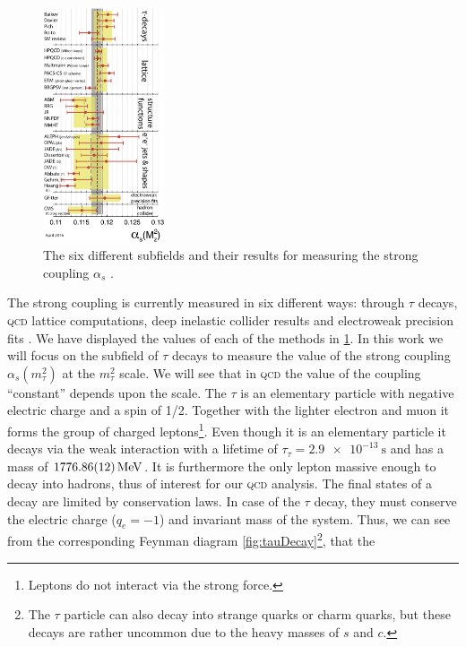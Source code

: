 \documentclass[../../index.tex]{subfiles}
\begin{document}
\begin{figure}
  \centering \vspace{-0.75cm}
  \includegraphics[width=0.32\textwidth]{./images/alphasDetermination.eps}
  \captionsetup{format=plain,font=footnotesize}
  \caption{The six different subfields and their results for measuring the
    strong coupling \(\alpha_s\) \cite{PDG2018}.}
  \label{fig:alphaSDetermination}
\end{figure}
The strong coupling is currently measured in six different ways: through
\(\tau\) decays, \textsc{qcd} lattice computations, deep inelastic collider
results and electroweak precision fits \cite{PDG2018}. We have displayed the
values of each of the methods in \cref{fig:alphaSDetermination}. In this work we
will focus on the subfield of \(\tau\) decays to measure the value of the strong
coupling \(\alpha_s(m_\tau^2)\) at the \(m_\tau^2\) scale. We will see that in
\textsc{qcd} the value of the coupling ``constant'' depends upon the scale. The
\(\tau\) is an elementary particle with negative electric charge and a spin of
1/2. Together with the lighter electron and muon it forms the group of charged
leptons\footnote{Leptons do not interact via the strong force.}. Even though it
is an elementary particle it decays via the weak interaction with a lifetime of
\(\tau_\tau=\SI{2.9e-13}{\second}\) and has a mass of
\(\SI{1776.86\pm0.12}{\mega\electronvolt}\)\cite{PDG2018}. It is furthermore the
only lepton massive enough to decay into hadrons, thus of interest for our
\textsc{qcd} analysis. The final states of a decay are limited by conservation
laws. In case of the \(\tau\) decay, they must conserve the electric charge
(\(q_e=-1\)) and invariant mass of the system. Thus, we can see from the
corresponding Feynman diagram \cref{fig:tauDecay}\footnote{The \(\tau\) particle
  can also decay into strange quarks or charm quarks, but these decays are
  rather uncommon due to the heavy masses of \(s\) and \(c\).}, that the
\end{document}
